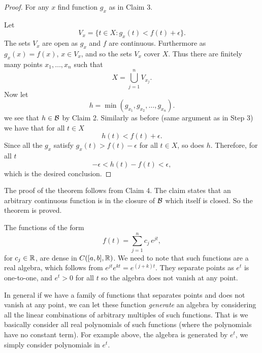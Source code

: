 \begin{proof}
For any $x$ find function $g_x$ as in Claim 3.

Let
\begin{equation*}
V_x = \{ t \in X : g_x(t) < f(t) + \epsilon \}.
\end{equation*}
The sets $V_x$ are open as $g_x$ and $f$ are continuous.
Furthermore as $g_x(x) = f(x)$, $x \in V_x$, and so the sets $V_x$ cover $X$.  Thus
there
are finitely many points $x_1,\ldots,x_n$ such that
\begin{equation*}
X = \bigcup_{j=1}^n V_{x_j} .
\end{equation*}
Now let
\begin{equation*}
h = \min(g_{x_1},g_{x_2},\ldots,g_{x_n}) .
\end{equation*}
we see that $h \in {\mathcal{B}}$ by Claim 2.  Similarly as before (same argument as in
Step 3) we have that for all
$t \in X$
\begin{equation*}
h(t) < f(t) + \epsilon .
\end{equation*}
Since all the $g_x$ satisfy $g_x(t) > f(t) - \epsilon$ for all $t \in X$, so does $h$.
Therefore, for all $t$
\begin{equation*}
-\epsilon < h(t) - f(t) < \epsilon ,
\end{equation*}
which is the desired conclusion.
\end{proof}

The proof of the theorem follows from Claim 4.  The claim states that an
arbitrary continuous function is in the closure of ${\mathcal{B}}$ which itself is
closed.  So the theorem is proved.

\begin{example}
The functions of the form
\begin{equation*}
f(t) = \sum_{j=1}^n c_j \, e^{jt},
\end{equation*}
for $c_j \in {\mathbb{R}}$,
are dense in $C([a,b],{\mathbb{R}})$.  We need to note that such functions are a real
algebra, which follows from $e^{jt} e^{kt} = e^{(j+k)t}$.  They separate
points as $e^t$ is one-to-one, and $e^t > 0$ for all $t$ so the algebra
does not vanish at any point.
\end{example}

In general if we have a family of functions that separates points and does
not vanish at any point, we can let these function \emph{generate} an algebra
by considering all the linear combinations of arbitrary multiples of such
functions.  That is we basically consider all real polynomials of such
functions (where the polynomials have no constant term).  For example above,
the algebra is generated by $e^t$, we simply
consider polynomials in $e^t$.

